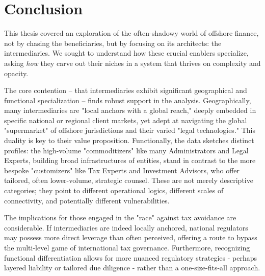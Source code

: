 \chapter{Conclusion}
\label{chap:conclusion}

This thesis covered an exploration of the often-shadowy world of offshore finance, not by chasing the beneficiaries, but by focusing on its architects: the intermediaries. We sought to understand how these crucial enablers specialize, asking \textit{how} they carve out their niches in a system that thrives on complexity and opacity. 

The core contention – that intermediaries exhibit significant geographical and functional specialization – finds robust support in the analysis. Geographically, many intermediaries are "local anchors with a global reach," deeply embedded in specific national or regional client markets, yet adept at navigating the global "supermarket" of offshore jurisdictions and their varied "legal technologies." This duality is key to their value proposition. Functionally, the data sketches distinct profiles: the high-volume "commoditizers" like many Administrators and Legal Experts, building broad infrastructures of entities, stand in contrast to the more bespoke "customizers" like Tax Experts and Investment Advisors, who offer tailored, often lower-volume, strategic counsel. These are not merely descriptive categories; they point to different operational logics, different scales of connectivity, and potentially different vulnerabilities.

The implications for those engaged in the "race" against tax avoidance are considerable. If intermediaries are indeed locally anchored, national regulators may possess more direct leverage than often perceived, offering a route to bypass the multi-level game of international tax governance. Furthermore, recognizing functional differentiation allows for more nuanced regulatory strategies - perhaps layered liability or tailored due diligence - rather than a one-size-fits-all approach.

